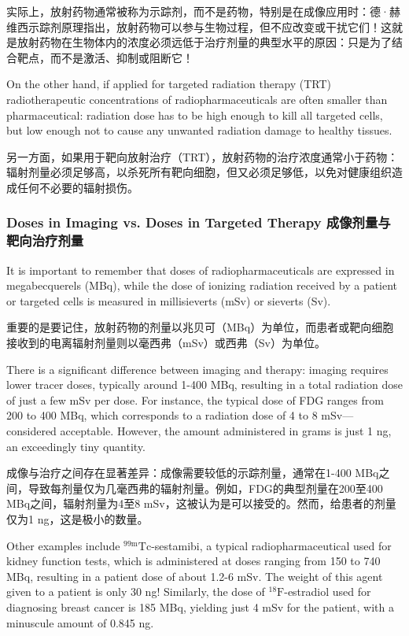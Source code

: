 \documentclass[dvipsnames, svgnames,a4paper,11pt]{article}
\begin{document}
实际上，放射药物通常被称为示踪剂，而不是药物，特别是在成像应用时：德·赫维西示踪剂原理指出，放射药物可以参与生物过程，但不应改变或干扰它们！这就是放射药物在生物体内的浓度必须远低于治疗剂量的典型水平的原因：只是为了结合靶点，而不是激活、抑制或阻断它！

On the other hand, if applied for targeted radiation therapy (TRT) radiotherapeutic concentrations of radiopharmaceuticals are often smaller than pharmaceutical: radiation dose has to be high enough to kill all targeted cells, but low enough not to cause any unwanted radiation damage to healthy tissues.

另一方面，如果用于靶向放射治疗（TRT），放射药物的治疗浓度通常小于药物：辐射剂量必须足够高，以杀死所有靶向细胞，但又必须足够低，以免对健康组织造成任何不必要的辐射损伤。

\subsubsection{Doses in Imaging vs. Doses in Targeted Therapy 成像剂量与靶向治疗剂量}

It is important to remember that doses of radiopharmaceuticals are expressed in megabecquerels (MBq), while the dose of ionizing radiation received by a patient or targeted cells is measured in millisieverts (mSv) or sieverts (Sv).

重要的是要记住，放射药物的剂量以兆贝可（MBq）为单位，而患者或靶向细胞接收到的电离辐射剂量则以毫西弗（mSv）或西弗（Sv）为单位。

There is a significant difference between imaging and therapy: imaging requires lower tracer doses, typically around 1-400 MBq, resulting in a total radiation dose of just a few mSv per dose. For instance, the typical dose of FDG ranges from 200 to 400 MBq, which corresponds to a radiation dose of 4 to 8 mSv—considered acceptable. However, the amount administered in grams is just 1 ng, an exceedingly tiny quantity.

成像与治疗之间存在显著差异：成像需要较低的示踪剂量，通常在1-400 MBq之间，导致每剂量仅为几毫西弗的辐射剂量。例如，FDG的典型剂量在200至400 MBq之间，辐射剂量为4至8 mSv，这被认为是可以接受的。然而，给患者的剂量仅为1 ng，这是极小的数量。

Other examples include ${}^\text{99m}\text{Tc}$-sestamibi, a typical radiopharmaceutical used for kidney function tests, which is administered at doses ranging from 150 to 740 MBq, resulting in a patient dose of about 1.2-6 mSv. The weight of this agent given to a patient is only 30 ng! Similarly, the dose of ${}^\text{18}\text{F}$-estradiol used for diagnosing breast cancer is 185 MBq, yielding just 4 mSv for the patient, with a minuscule amount of 0.845 ng.
\end{document}
